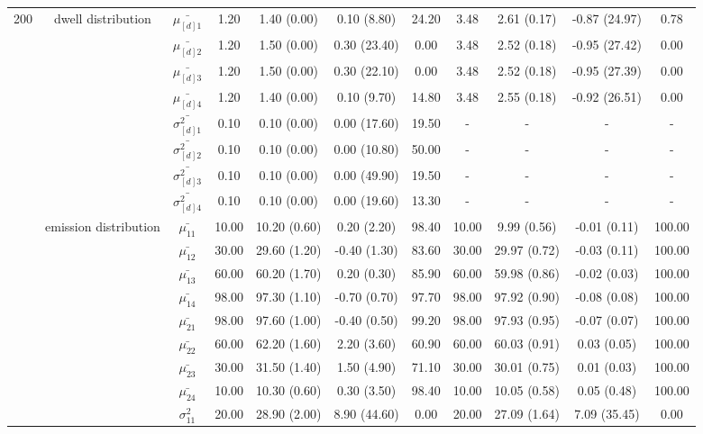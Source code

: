 \begin{table}[h]
{\begin{tabular}{ccccccccccc}
200 & dwell distribution & $\bar{\mu_{[d]1}}$ & 1.20 & 1.40 (0.00) & 0.10 (8.80) & 24.20 & 3.48 & 2.61 (0.17) & -0.87 (24.97) & 0.78 \\
\multirow{39}{*}{} & \multirow{7}{*}{} & $\bar{\mu_{[d]2}}$ & 1.20 & 1.50 (0.00) & 0.30 (23.40) & 0.00 & 3.48 & 2.52 (0.18) & -0.95 (27.42) & 0.00 \\
 &  & $\bar{\mu_{[d]3}}$ & 1.20 & 1.50 (0.00) & 0.30 (22.10) & 0.00 & 3.48 & 2.52 (0.18) & -0.95 (27.39) & 0.00 \\
 &  & $\bar{\mu_{[d]4}}$ & 1.20 & 1.40 (0.00) & 0.10 (9.70) & 14.80 & 3.48 & 2.55 (0.18) & -0.92 (26.51) & 0.00 \\
 &  & $\bar{\sigma^2_{[d]1}}$ & 0.10 & 0.10 (0.00) & 0.00 (17.60) & 19.50 & - & - & - & - \\
 &  & $\bar{\sigma^2_{[d]2}}$ & 0.10 & 0.10 (0.00) & 0.00 (10.80) & 50.00 & - & - & - & - \\
 &  & $\bar{\sigma^2_{[d]3}}$ & 0.10 & 0.10 (0.00) & 0.00 (49.90) & 19.50 & - & - & - & - \\
 &  & $\bar{\sigma^2_{[d]4}}$ & 0.10 & 0.10 (0.00) & 0.00 (19.60) & 13.30 & - & - & - & - \\
 & emission distribution & $\bar{\mu_{11}}$ & 10.00 & 10.20 (0.60) & 0.20 (2.20) & 98.40 & 10.00 & 9.99 (0.56) & -0.01 (0.11) & 100.00 \\
 & \multirow{15}{*}{} & $\bar{\mu_{12}}$ & 30.00 & 29.60 (1.20) & -0.40 (1.30) & 83.60 & 30.00 & 29.97 (0.72) & -0.03 (0.11) & 100.00 \\
 &  & $\bar{\mu_{13}}$ & 60.00 & 60.20 (1.70) & 0.20 (0.30) & 85.90 & 60.00 & 59.98 (0.86) & -0.02 (0.03) & 100.00 \\
 &  & $\bar{\mu_{14}}$ & 98.00 & 97.30 (1.10) & -0.70 (0.70) & 97.70 & 98.00 & 97.92 (0.90) & -0.08 (0.08) & 100.00 \\
 &  & $\bar{\mu_{21}}$ & 98.00 & 97.60 (1.00) & -0.40 (0.50) & 99.20 & 98.00 & 97.93 (0.95) & -0.07 (0.07) & 100.00 \\
 &  & $\bar{\mu_{22}}$ & 60.00 & 62.20 (1.60) & 2.20 (3.60) & 60.90 & 60.00 & 60.03 (0.91) & 0.03 (0.05) & 100.00 \\
 &  & $\bar{\mu_{23}}$ & 30.00 & 31.50 (1.40) & 1.50 (4.90) & 71.10 & 30.00 & 30.01 (0.75) & 0.01 (0.03) & 100.00 \\
 &  & $\bar{\mu_{24}}$ & 10.00 & 10.30 (0.60) & 0.30 (3.50) & 98.40 & 10.00 & 10.05 (0.58) & 0.05 (0.48) & 100.00 \\
 &  & $\sigma^2_{11}$ & 20.00 & 28.90 (2.00) & 8.90 (44.60) & 0.00 & 20.00 & 27.09 (1.64) & 7.09 (35.45) & 0.00 \\

\end{tabular}}
\end{table}
